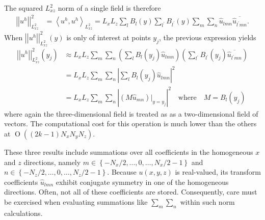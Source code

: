 \documentclass[letterpaper,11pt,nointlimits,reqno]{amsart}
\newcommand{\OO}[1]{\operatorname{O}\left(#1\right)}
\begin{document}
The squared $L_{xz}^2$ norm of a single field is therefore
\begin{align}
  \left|\left|
    u^h
  \right|\right|^{2}_{L^{2}_{xz}}
&=
  \left<
    u^h
  ,
    u^h
  \right>_{L^{2}_{xz}}
 =
  L_x L_z
  \sum_{l}
  B_l\!\left(y\right)
  \sum_{l^\prime}
  B_{l^\prime}\!\left(y\right)
  \sum_{m} \sum_{n} \hat{u}_{l m n} \overline{\hat{u}_{l^\prime m n}}
  .
\end{align}
%
When $\left|\left|u^h\right|\right|^{2}_{L^{2}_{xz}} \!(y)$ is
only of interest at points $y_j$, the previous expression yields
\begin{align}
  \left|\left|
    u^h
  \right|\right|^{2}_{L^{2}_{xz}}
  \!(y_j)
&\approx
  L_x L_z
  \sum_{m} \sum_{n}
  \left(
    \sum_{l}
    B_l\!\left(y_j\right)
    \hat{u}_{l m n}
  \right)
  \left(
    \sum_{l^\prime}
    B_{l^\prime}\!\left(y_j\right)
    \overline{\hat{u}_{l^\prime m n}}
  \right)
\\ &=
  L_x L_z
  \sum_{m} \sum_{n}
  \left|
    \sum_{l}
    B_l\!\left(y_j\right)
    \hat{u}_{l m n}
  \right|^{2}
\\ &=
  L_x L_z
  \sum_{m} \sum_{n}
  \left|
      \left(M \hat{u}_{m n}\right)\bigr|_{y=y_j}
  \right|^{2}
  \quad\text{where}\quad
  M = B_l\!\left(y_j\right)
\end{align}
where again the three-dimensional field is treated as as a two-dimensional
field of vectors.  The computational cost for this operation is much lower than
the others at $\OO{\left(2k-1\right) N_x N_y N_z}$.


These three results include summations over all coefficients in the homogeneous
$x$ and $z$ directions, namely $m \in \left\{-N_x/2, \dots, 0, \dots,
N_x/2-1\right\}$ and $n \in \left\{-N_z/2, \dots, 0, \dots, N_z/2-1\right\}$.
Because $u\!\left(x,y,z\right)$ is real-valued, its transform coefficients
$\hat{u}_{lmn}$ exhibit conjugate symmetry in one of the homogeneous
directions.  Often, not all of these coefficients are stored.  Consequently,
care must be exercised when evaluating summations like $\sum_m \sum_n$ within
such norm calculations.
\end{document}
